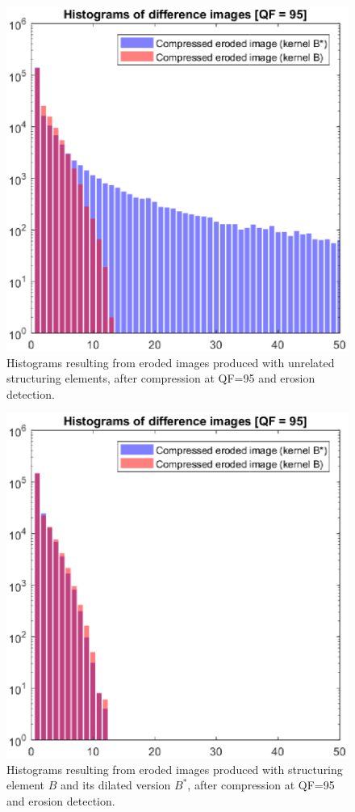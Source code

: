 \documentclass[review]{elsarticle}
\begin{document}
\begin{figure}[!ht]
	\centering
	\includegraphics[scale=0.55]{hist_ero_ero_diff.eps}
	\caption{Histograms resulting from eroded images produced with unrelated structuring elements, after compression at QF=95 and erosion detection.}
	\label{fig:hist_ero_ero_diff}
\end{figure}

\begin{figure}[!ht]
	\centering
	\includegraphics[scale=0.55]{hist_ero_ero_albero.eps}
	\caption{Histograms resulting from eroded images produced with structuring element $B$ and its dilated version $B^*$, after compression at QF=95 and erosion detection.}
	\label{fig:hist_ero_ero_albero}
\end{figure}
\end{document}

